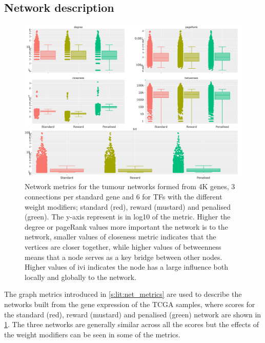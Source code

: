 \subsection{Network description} \label{s:N_I:tum_describe}

\begin{figure}[!t]  
\centering
\includegraphics[width=1.0\textwidth,keepaspectratio]{Sections/Network_I/Resources/Tum_network/NetworkMetricsComp_6TF.png}
    \caption{Network metrics for the tumour networks formed from 4K genes, 3 connections per standard gene and 6 for TFs with the different weight modifiers; standard (red), reward (mustard) and penalised (green). The y-axis represent is in log10 of the metric. Higher the degree or pageRank values more important the network is to the network, smaller values of closeness metric indicates that the vertices are closer together, while higher values of betweenness means that a node serves as a key bridge between other nodes. Higher values of \acrfull{ivi} indicates the node has a large influence both locally and globally to the network.}
    \label{fig:N_I:net_metrics_tum}
\end{figure}

The graph metrics introduced in \cref{s:lit:net_metrics} are used to describe the networks built from the gene expression of the TCGA samples, where scores for the standard (red), reward (mustard) and penalised (green) network are shown in \cref{fig:N_I:net_metrics_tum}. The three networks are generally similar across all the scores but the effects of the weight modifiers can be seen in some of the metrics. 

